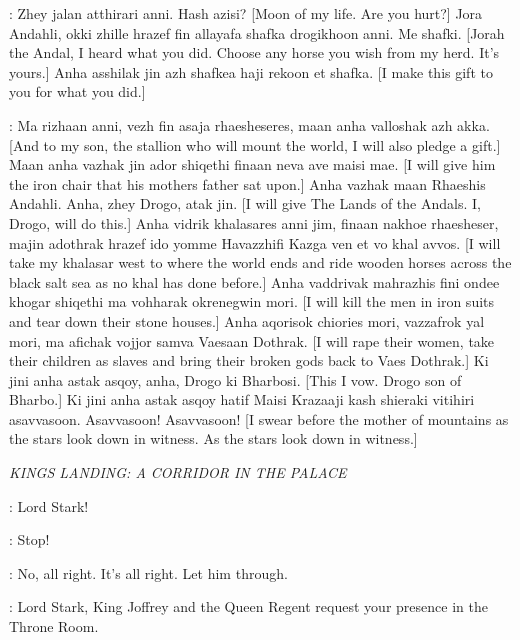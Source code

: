
\DROGO: Zhey jalan atthirari anni. Hash azisi? [Moon of my life. Are you hurt?] Jora Andahli, okki zhille hrazef fin allayafa shafka drogikhoon anni. Me shafki. [Jorah the Andal, I heard what you did. Choose any horse you wish from my herd. It's yours.] Anha asshilak jin azh shafkea haji rekoon et shafka. [I make this gift to you for what you did.]


\DROGO: Ma rizhaan anni, vezh fin asaja rhaesheseres, maan anha valloshak azh akka. [And to my son, the stallion who will mount the world, I will also pledge a gift.] Maan anha vazhak jin ador shiqethi finaan neva ave maisi mae. [I will give him the iron chair that his mothers father sat upon.] Anha vazhak maan Rhaeshis Andahli. Anha, zhey Drogo, atak jin. [I will give The Lands of the Andals. I, Drogo, will do this.] Anha vidrik khalasares anni jim, finaan nakhoe rhaesheser, majin adothrak hrazef ido yomme Havazzhifi Kazga ven et vo khal avvos. [I will take my khalasar west to where the world ends and ride wooden horses across the black salt sea as no khal has done before.] Anha vaddrivak mahrazhis fini ondee khogar shiqethi ma vohharak okrenegwin mori. [I will kill the men in iron suits and tear down their stone houses.] Anha aqorisok chiories mori, vazzafrok yal mori, ma afichak vojjor samva Vaesaan Dothrak. [I will rape their women, take their children as slaves and bring their broken gods back to Vaes Dothrak.] Ki jini anha astak asqoy, anha, Drogo ki Bharbosi. [This I vow. Drogo son of Bharbo.] Ki jini anha astak asqoy hatif Maisi Krazaaji kash shieraki vitihiri asavvasoon. Asavvasoon! Asavvasoon! [I swear before the mother of mountains as the stars look down in witness. As the stars look down in witness.] 


\scene

\textit{KINGS LANDING: A CORRIDOR IN THE PALACE} 


\PAGE:  Lord Stark!

\BANNERMAN: Stop! 

\NED: No, all right. It's all right. Let him through. 

\PAGE: Lord Stark, King Joffrey and the Queen Regent request your presence in the Throne Room. 

